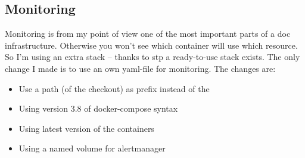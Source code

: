 

\subsection{Monitoring}

Monitoring is from my point of view one of the most important parts of a
\gls{doc} infrastructure. Otherwise you won't see which container will use
which resource. So I'm using an extra stack -- thanks to \gls{stp} a ready-to-use
stack exists. The only change I made is to use an own yaml-file for monitoring.
The changes are:

\begin{itemize}
    \item Use a path (of the checkout) as prefix instead of the 
    \item Using version 3.8 of docker-compose syntax
    \item Using latest version of the containers
    \item Using a named volume for alertmanager
\end{itemize}

